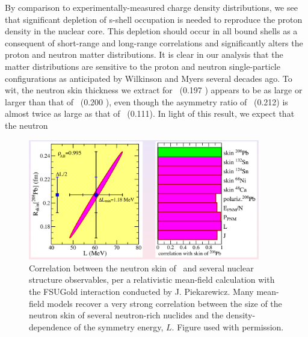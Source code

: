 By comparison to experimentally-measured charge density distributions, we see 
that significant depletion of s-shell occupation is needed to reproduce the
proton density in the nuclear core. This depletion should occur in all bound
shells as a consequent of short-range and long-range correlations and
significantly alters the proton and neutron matter distributions.
It is clear in our analysis that the matter distributions are sensitive
to the proton and neutron single-particle configurations as anticipated by
Wilkinson \cite{Wilkinson1967} and Myers \cite{Myers1969} several decades ago.
To wit, the neutron skin thickness we
extract for \oEight\ (0.197 \femto\meter) appears
to be as large or larger than that of
\pbEight\ (0.200 \femto\meter), even though the asymmetry ratio of \pbEight\
(0.212) is almost twice as large as that of \oEight\ (0.111). In light of this
result, we expect that the neutron
\begin{figure}[tb]
    \centering
    \includegraphics[width=0.9\textwidth]{figures/PiekarewiczPb208SkinCorrelation.png}
    \caption[Correlation between the neutron skin of \pbEight\ and several nuclear structure
    observables]
    {
        Correlation between the neutron skin of \pbEight\ and several nuclear structure observables,
        per a relativistic mean-field calculation with the FSUGold interaction
        conducted by J. Piekarewicz. Many
        mean-field models recover a very strong correlation between the size of the
        neutron skin of several neutron-rich nuclides and the density-dependence of the symmetry
        energy, $L$. Figure used with permission.
    }
    \label{PiekarewiczPb208SkinCorrelation}
\end{figure}
